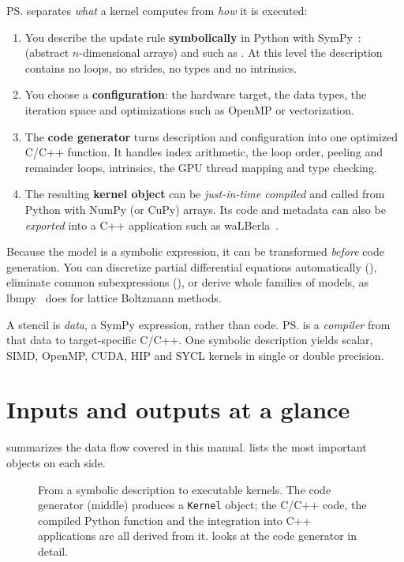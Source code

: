 \ps{} separates \emph{what} a kernel computes from \emph{how} it is executed:
\begin{enumerate}
  \item You describe the update rule \textbf{symbolically} in Python with
        SymPy~\cite{sympy}:  (abstract $n$-dimensional arrays) and
         such as .
        At this level the description contains no loops, no strides, no types and no
        intrinsics.
  \item You choose a \textbf{configuration}: the hardware target, the data types, the
        iteration space and optimizations such as OpenMP or vectorization.
  \item The \textbf{code generator}  turns description and
        configuration into one optimized C/C++ function. It handles index arithmetic,
        the loop order, peeling and remainder loops, intrinsics, the GPU thread mapping
        and type checking.
  \item The resulting \textbf{kernel object} can be \emph{just-in-time compiled} and
        called from Python with NumPy (or CuPy) arrays. Its code and metadata can also be
        \emph{exported} into a C++ application such as waLBerla~\cite{walberla}.
\end{enumerate}
Because the model is a symbolic expression, it can be transformed \emph{before} code
generation. You can discretize partial differential equations automatically
(), eliminate common subexpressions (), or derive whole
families of models, as lbmpy~\cite{lbmpy} does for lattice Boltzmann methods.

\begin{keyidea}
  A stencil is \emph{data}, a SymPy expression, rather than code. \ps{} is a
  \emph{compiler} from that data to target-specific C/C++. One symbolic description
  yields scalar, SIMD, OpenMP, CUDA, HIP and SYCL kernels in single or double precision.
\end{keyidea}

\section{Inputs and outputs at a glance}

 summarizes the data flow covered in this manual.
 lists the most important objects on each side.

\begin{figure}[htbp]
  \centering
  
  \caption[From a symbolic description to executable kernels]{From a symbolic
    description to executable kernels. The code generator (middle) produces a
    \texttt{Kernel} object; the C/C++ code, the compiled Python function and the
    integration into C++ applications are all derived from it. 
    looks at the code generator in detail.}
  \label{r01:fig:big-picture}
\end{figure}

